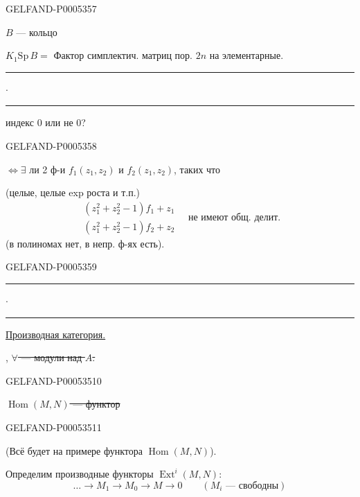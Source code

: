 \begin{GelfandAdjacentEvidence}{GELFAND-P000535}{7}


$B$ — кольцо

$K_1\mathrm{Sp}\,B=$ Фактор симплектич. матриц пор. $2n$ на элементарные.

\hfill\rule{1cm}{.35pt}\enspace\(\cdot\)\enspace\rule{1.2cm}{.35pt}\par

\qquad{}
\qquad индекс $0$ или не $0$?
\end{GelfandAdjacentEvidence}
\begin{GelfandAdjacentEvidence}{GELFAND-P000535}{8}


$\Longleftrightarrow\exists$ ли 2 ф-и $f_1(z_1,z_2)$ и $f_2(z_1,z_2)$, таких что

(целые, целые exp роста и т.п.)
\[
\begin{gathered}
(z_1^2+z_2^2-1)f_1+z_1\\
(z_1^2+z_2^2-1)f_2+z_2
\end{gathered}
\quad\text{не имеют общ. делит.}
\]
(в полиномах нет, в непр. ф-ях есть).
\end{GelfandAdjacentEvidence}
\begin{GelfandAdjacentEvidence}{GELFAND-P000535}{9}


\hfill\rule{1.4cm}{.35pt}\enspace\(\cdot\)\enspace\rule{1.3cm}{.35pt}\par

\qquad\uline{Производная категория.}

,
\sout{\mbox{$\forall$} — модули над \mbox{$A$}.}
\end{GelfandAdjacentEvidence}
\begin{GelfandAdjacentEvidence}{GELFAND-P000535}{10}


\sout{\mbox{$\operatorname{Hom}(M,N)$} — функтор}
\end{GelfandAdjacentEvidence}
\begin{GelfandAdjacentEvidence}{GELFAND-P000535}{11}



(Всё будет на примере функтора $\operatorname{Hom}(M,N)$).

Определим производные функторы $\operatorname{Ext}^i(M,N)$:
\[
\ldots\to M_1\to M_0\to M\to0\qquad (M_i\text{ — свободны})
\]
\end{GelfandAdjacentEvidence}
